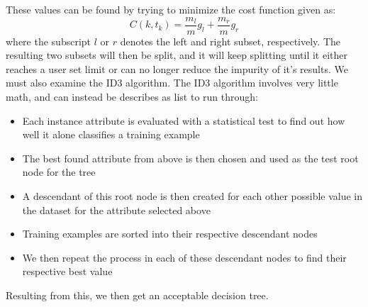 \documentclass{article}
\begin{document}
These values can be found by trying to minimize the cost function given as:
\begin{equation*}
    C(k, t_k) = \frac{m_l}{m}g_l + \frac{m_r}{m}g_r
\end{equation*}
where the subscript $l$ or $r$ denotes the left and right subset, respectively. The resulting two subsets will then be split, and it will keep splitting until it either reaches a user set limit or can no longer reduce the impurity of it's results. \newpage
We must also examine the ID3 algorithm.
\newline The ID3 algorithm involves very little math, and can instead be describes as list to run through:
\begin{itemize}
    \item Each instance attribute is evaluated with a statistical test to find out how well it alone classifies a training example
    \item The best found attribute from above is then chosen and used as the test root node for the tree
    \item A descendant of this root node is then created for each other possible value in the dataset for the attribute selected above
    \item Training examples are sorted into their respective descendant nodes
    \item We then repeat the process in each of these descendant nodes to find their respective best value
\end{itemize}
Resulting from this, we then get an acceptable decision tree.
\end{document}
